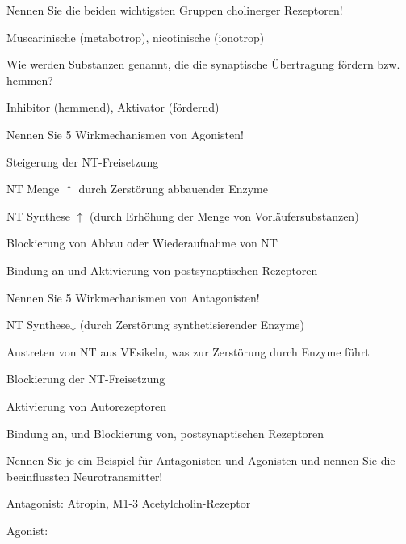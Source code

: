 \documentclass[10pt, a4paper]{exam}
\begin{document}
\begin{questions}
\begin{solution}
  \end{solution}

  \question Nennen Sie die beiden wichtigsten Gruppen cholinerger Rezeptoren!
  \begin{solution}
    Muscarinische (metabotrop), nicotinische (ionotrop)
  \end{solution}

  \question Wie werden Substanzen genannt, die die synaptische Übertragung fördern bzw. hemmen?
  \begin{solution}
    Inhibitor (hemmend), Aktivator (fördernd)
  \end{solution}

  \question Nennen Sie 5 Wirkmechanismen von Agonisten!
  \begin{solution}
    \begin{itemize*}
      \item Steigerung der NT-Freisetzung
      \item NT Menge $\uparrow$ durch Zerstörung abbauender Enzyme
      \item NT Synthese $\uparrow$ (durch Erhöhung der Menge von Vorläufersubstanzen)
      \item Blockierung von Abbau oder Wiederaufnahme von NT
      \item Bindung an und Aktivierung von postsynaptischen Rezeptoren
    \end{itemize*}
  \end{solution}

  \question Nennen Sie 5 Wirkmechanismen von Antagonisten!
  \begin{solution}
    \begin{itemize*}
      \item NT Synthese↓ (durch Zerstörung synthetisierender Enzyme)
      \item Austreten von NT aus VEsikeln, was zur Zerstörung durch Enzyme führt
      \item Blockierung der NT-Freisetzung
      \item Aktivierung von Autorezeptoren
      \item Bindung an, und Blockierung von, postsynaptischen Rezeptoren
    \end{itemize*}
  \end{solution}

  \question Nennen Sie je ein Beispiel für Antagonisten und Agonisten und nennen Sie die beeinflussten Neurotransmitter!
  \begin{solution}
    \begin{itemize*}
      \item Antagonist: Atropin, M1-3 Acetylcholin-Rezeptor
      \item Agonist:
    \end{itemize*}
  \end{solution}


\end{questions}
\end{document}
